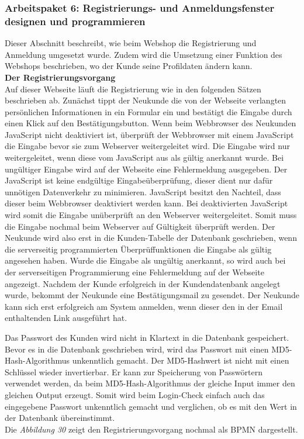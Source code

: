 \newpage
\subsubsection{Arbeitspaket 6: Registrierungs- und Anmeldungsfenster designen und programmieren}
Dieser Abschnitt beschreibt, wie beim Webshop die Registrierung und Anmeldung umgesetzt wurde. Zudem wird die Umsetzung einer Funktion des Webshops beschrieben, wo der Kunde seine Profildaten ändern kann.\\

\textbf{Der Registrierungsvorgang}\\
Auf dieser Webseite läuft die Registrierung wie in den folgenden Sätzen beschrieben ab. Zunächst tippt der Neukunde die von der Webseite verlangten persönlichen Informationen in ein Formular ein und bestätigt die Eingabe durch einen Klick auf den Bestätigungsbutton. Wenn beim Webbrowser des Neukunden JavaScript nicht deaktiviert ist, überprüft der Webbrowser mit einem JavaScript die Eingabe bevor sie zum Webserver weitergeleitet wird. Die Eingabe wird nur weitergeleitet, wenn diese vom JavaScript aus als gültig anerkannt wurde. Bei ungültiger Eingabe wird auf der Webseite eine Fehlermeldung ausgegeben. Der JavaScript ist keine endgültige Eingabeüberprüfung, dieser dient nur dafür unnötigen Datenverkehr zu minimieren. JavaScript besitzt den Nachteil, dass dieser beim Webbrowser deaktiviert werden kann. Bei deaktivierten JavaScript wird somit die Eingabe unüberprüft an den Webserver weitergeleitet. Somit muss die Eingabe nochmal beim Webserver auf Gültigkeit überprüft werden.  Der Neukunde wird also erst in die Kunden-Tabelle der Datenbank geschrieben, wenn die serverseitig programmierten Überprüffunktionen die Eingabe als gültig angesehen haben. Wurde die Eingabe als ungültig anerkannt, so wird auch bei der serverseitigen Programmierung eine Fehlermeldung auf der Webseite angezeigt. Nachdem der Kunde erfolgreich in der Kundendatenbank angelegt wurde, bekommt der Neukunde eine Bestätigungsmail zu gesendet. Der Neukunde kann sich erst erfolgreich am System anmelden, wenn dieser den in der Email enthaltenden Link ausgeführt hat. 

Das Passwort des Kunden wird nicht in Klartext in die Datenbank gespeichert. Bevor es in die Datenbank geschrieben wird, wird das Passwort mit einen \glqq MD5-Hash-Algorithmus\grqq{} unkenntlich gemacht. Der MD5-Hashwert ist nicht mit einen Schlüssel wieder invertierbar. Er kann zur Speicherung von Passwörtern verwendet werden, da beim \glqq MD5-Hash-Algorithmus\grqq{} der gleiche Input immer den gleichen Output erzeugt. Somit wird beim Login-Check einfach auch das eingegebene Passwort unkenntlich gemacht und verglichen, ob es mit den Wert in der Datenbank übereinstimmt.\\ Die \textit{Abbildung 30} zeigt den Registrierungsvorgang nochmal als BPMN dargestellt.\\


